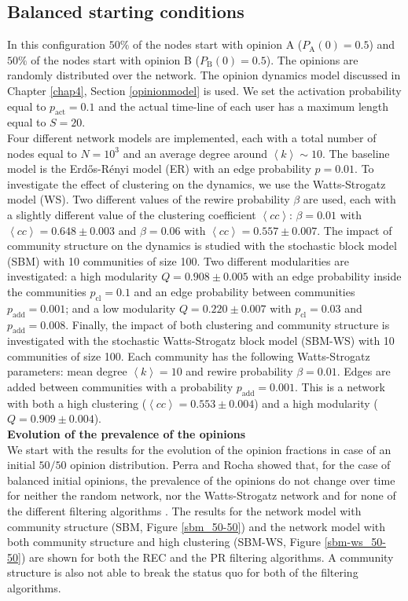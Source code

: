 \documentclass[11 pt , letterpaper , twoside , openright]{book}
\begin{document}
\subsection{Balanced starting conditions}
\label{50-50}
In this configuration $50 \%$ of the nodes start with opinion A ($P_{\text{A}}(0) = 0.5$) and $50 \%$ of the nodes start with opinion B ($P_{\text{B}}(0) = 0.5$). The opinions are randomly distributed over the network. The opinion dynamics model discussed in Chapter \ref{chap4}, Section \ref{opinionmodel} is used. We set the activation probability equal to $p_{\text{act}} = 0.1$ and the actual time-line of each user has a maximum length equal to $S=20$.\\
\newline
Four different network models are implemented, each with a total number of nodes equal to $N = 10^3$ and an average degree around $\left<k\right> \sim 10$. The baseline model is the Erd\H{o}s-R\'{e}nyi model (ER) with an edge probability $p = 0.01$. To investigate the effect of clustering on the dynamics, we use the Watts-Strogatz model (WS). Two different values of the rewire probability $\beta$ are used, each with a slightly different value of the clustering coefficient $\left<cc\right>$: $\beta = 0.01$ with $\left<cc\right> = 0.648 \pm 0.003$ and $\beta = 0.06$ with $\left<cc\right> = 0.557 \pm 0.007$. The impact of community structure on the dynamics is studied with the stochastic block model (SBM) with 10 communities of size 100. Two different modularities are investigated: a high modularity $Q = 0.908 \pm 0.005$ with an edge probability inside the communities $p_{\text{cl}} = 0.1$ and an edge probability between communities $p_{\text{add}} = 0.001$; and a low modularity $Q = 0.220 \pm 0.007$ with $p_{\text{cl}} = 0.03$ and $p_{\text{add}} = 0.008$. Finally, the impact of both clustering and community structure is investigated with the stochastic Watts-Strogatz block model (SBM-WS) with 10 communities of size 100. Each community has the following Watts-Strogatz parameters: mean degree $\left<k\right> =10$ and rewire probability $\beta = 0.01$. Edges are added between communities with a probability $p_{\text{add}} = 0.001$. This is a network with both a high clustering ($\left<cc\right> = 0.553 \pm 0.004$) and a high modularity ($Q = 0.909 \pm 0.004$).  \\
\newline
\textbf{Evolution of the prevalence of the opinions}\\
\newline
We start with the results for the evolution of the opinion fractions in case of an initial $50/50$ opinion distribution. Perra and Rocha showed that, for the case of balanced initial opinions, the prevalence of the opinions do not change over time for neither the random network, nor the Watts-Strogatz network and for none of the different filtering algorithms \cite{Perra2019}. The results for the network model with community structure (SBM, Figure \ref{sbm_50-50}) and the network model with both community structure and high clustering (SBM-WS, Figure \ref{sbm-ws_50-50}) are shown for both the REC and the PR filtering algorithms. A community structure is also not able to break the status quo for both of the filtering algorithms. 
\end{document}
